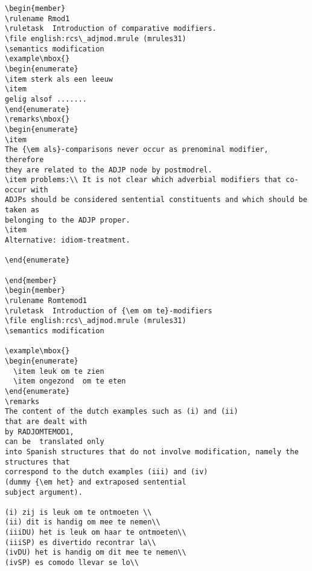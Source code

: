\begin{verbatim}
\begin{member}
\rulename Rmod1
\ruletask  Introduction of comparative modifiers.
\file english:rcs\_adjmod.mrule (mrules31)
\semantics modification 
\example\mbox{}
\begin{enumerate}
\item sterk als een leeuw
\item
gelig alsof .......
\end{enumerate}
\remarks\mbox{}
\begin{enumerate}
\item
The {\em als}-comparisons never occur as prenominal modifier, therefore 
they are related to the ADJP node by postmodrel.
\item problems:\\ It is not clear which adverbial modifiers that co-occur with
ADJPs should be considered sentential constituents and which should be taken as 
belonging to the ADJP proper.
\item 
Alternative: idiom-treatment. 

\end{enumerate}

\end{member}
\begin{member}
\rulename Romtemod1
\ruletask  Introduction of {\em om te}-modifiers
\file english:rcs\_adjmod.mrule (mrules31)
\semantics modification 

\example\mbox{}
\begin{enumerate}
  \item leuk om te zien
  \item ongezond  om te eten
\end{enumerate}
\remarks
The content of the dutch examples such as (i) and (ii)
that are dealt with
by RADJOMTEMOD1, 
can be  translated only 
into Spanish structures that do not involve modification, namely the structures that
correspond to the dutch examples (iii) and (iv) 
(dummy {\em het} and extraposed sentential 
subject argument).

(i) zij is leuk om te ontmoeten \\ 
(ii) dit is handig om mee te nemen\\ 
(iiiDU) het is leuk om haar te ontmoeten\\
(iiiSP) es divertido recontrar la\\
(ivDU) het is handig om dit mee te nemen\\
(ivSP) es comodo llevar se lo\\


\end{verbatim}
